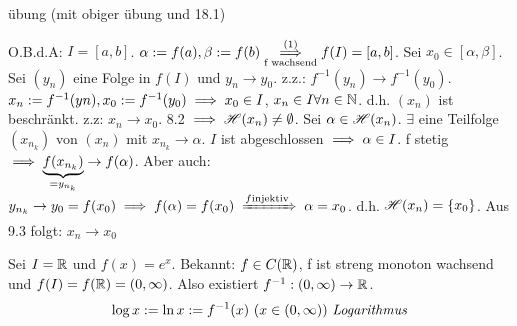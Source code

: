 \documentclass[a4paper,oneside,DIV15,BCOR12mm]{scrbook}
\begin{document}
\begin{beweis}
\begin{liste}
\item übung (mit obiger übung und 18.1)
\item O.B.d.A: $I=[a, b]$. $\alpha:=f(a), \beta:=f(b) \overset{(1)}{\underset{\text{f wachsend}}{\implies}} f(I)=[a,b]$. Sei $x_0 \in [\alpha, \beta]$. Sei $(y_n)$ eine Folge in $f(I)$ und $y_n \to y_0$. z.z.: $f^{-1}(y_n) \to f^{-1}(y_0)$. $x_n:=f^{-1}(yn), x_0:=f^{-1}(y_0) \implies x_0 \in I$, $x_n \in I \forall n \in \mathbb{N}$. d.h. $(x_n)$ ist beschränkt. z.z: $x_n \to x_0$. 8.2 $\implies \mathscr{H}(x_n) \ne \emptyset$. Sei $\alpha \in \mathscr{H}(x_n)$. $\exists$ eine Teilfolge $(x_{n_k})$ von $(x_n)$ mit $x_{n_k} \to \alpha$. $I$ ist abgeschlossen $\implies \alpha \in I$. f stetig $\implies \underbrace{f(x_{n_k})}_{=y_{n_k}} \to f(\alpha)$. Aber auch: $y_{n_k} \to y_0 = f(x_0) \folgt f(\alpha) = f(x_0) \folgtwegen{f \text{injektiv}} \alpha=x_0$. d.h. $\mathscr{H}(x_n)=\{x_0\}$. Aus 9.3 folgt: $x_n \to x_0$
\end{liste}
\end{beweis}

\begin{satz}
Sei $I=\mathbb{R}$ und $f(x)=e^x$. Bekannt: $f \in C(\mathbb{R})$, f ist streng monoton wachsend und $f(I) = f(\mathbb{R}) = (0, \infty)$. Also existiert $f^{-1}: (0, \infty) \to \mathbb{R}$. 
\[ \log x := \ln x := f^{-1}(x)\ (x \in (0, \infty))\ \text{\emph{Logarithmus}} \]
\end{satz}

\theoremstyle{nonumberbreak}
\newtheorem{eigenschaften}[satz]{Eigenschaften}
\end{document}
